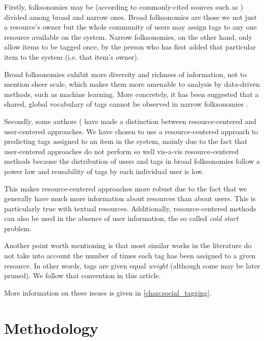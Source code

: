 Firstly, folksonomies may be (according to commonly-cited sources such as \cite{}) divided among broad and narrow ones. 
Broad folksonomies are those we not just a resource's owner but the whole community of users may assign tags to any one resource available on the system. Narrow folksonomies, on the other hand, only allow items to be tagged once, by the person who has first added that particular item to the system (i.e. that item's owner).

Broad folksonomies exhibit more diversity and richness of information, not to mention sheer scale, which makes them more amenable to analysis by data-driven methods, such as machine learning. More concretely, it has been suggested that a shared, global vocabulary of tags cannot be observed in narrow folksonomies \cite{schifanella_etal_2010}.


Secondly, some authors (\cite{song_etal_2011} have made a distinction between resource-centered and user-centered approaches. We have chosen to use a resource-centered approach to predicting tags assigned to an item in the system, mainly due to the fact \cite{song_etal_2011} that user-centered approaches do not perform so well vis-a-vis resource-centered methods because the distribution of users and tags in broad folksonomies follow a power law and reusability of tags by each individual user is low. 

This makes resource-centered approaches more robust due to the fact that we generally have much more information about resources than about users. This is particularly true with textual resources. Additionally, resource-centered methods can also be used in the absence of user information, the so called \textit{cold start} problem.

Another point worth mentioning is that most similar works in the literature do not take into account the number of times each tag has been assigned to a given resource. In other words, tags are given equal \textit{weight} (although some may be later pruned). We follow that convention in this article.

More information on these issues is given in \autoref{chap:social_tagging}.

\section{Methodology}\label{section:intro_methodology}


